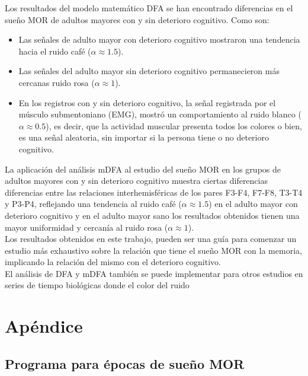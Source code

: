 \documentclass[letterpaper,titlepage,12pt,draft]{report}
\begin{document}
Los resultados del modelo matem\'atico DFA se han encontrado diferencias en el sue\~no MOR de adultos mayores con y sin deterioro cognitivo. Como son:
\begin{itemize}
\item Las se\~nales de adulto mayor con deterioro cognitivo mostraron una tendencia hacia el ruido caf\'e ($\alpha\approx 1.5$).
\item Las se\~nales del adulto mayor sin deterioro cognitivo permanecieron m\'as cercanas ruido rosa ($\alpha\approx 1$). 
\item En  los registros con y sin deterioro cognitivo, la se\~nal registrada por el m\'usculo submentoniano (EMG), mostr\'o un comportamiento al ruido blanco ($\alpha\approx 0.5$), es decir, que la actividad muscular presenta todos los colores o bien, es una se\~nal aleatoria, sin importar si la persona tiene o no deterioro cognitivo.
\end{itemize}

La aplicaci\'on del an\'alisis mDFA al estudio del sue\~no MOR en los grupos de adultos mayores con y sin deterioro cognitivo muestra ciertas diferencias diferencias entre las relaciones interhemisf\'ericas de los pares F3-F4, F7-F8, T3-T4 y P3-P4, reflejando una tendencia al ruido caf\'e ($\alpha\approx 1.5$) en el adulto mayor con deterioro cognitivo y en el adulto mayor sano los resultados obtenidos tienen una mayor uniformidad y cercan\'ia al ruido rosa ($\alpha\approx 1$).\\

Los resultados obtenidos en este trabajo, pueden ser una gu\'ia para comenzar un estudio m\'as exhaustivo sobre la relaci\'on que tiene el sue\~no MOR con la memoria, implicando la relaci\'on del mismo con el deterioro cognitivo.\\

El an\'alisis de DFA y mDFA tambi\'en se puede implementar para otros estudios en series de tiempo biol\'ogicas donde el color del ruido 

\chapter*{Ap\'endice}

\section{Programa para \'epocas de sue\~no MOR}
\end{document}
